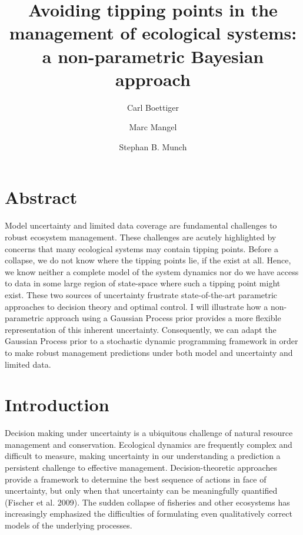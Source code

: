 \documentclass[author-year, review]{elsarticle} %
\begin{document}
\begin{frontmatter}
  \title{Avoiding tipping points in the management of ecological systems: a
non-parametric Bayesian approach}
  \author[cstar]{Carl Boettiger}
  \author[cstar]{Marc Mangel}
  \author[noaa]{Stephan B. Munch}
  \address[cstar]{Center for Stock Assessment Research, Department of Applied Math and Statistics, University of California, Mail Stop SOE-2, Santa Cruz, CA 95064, USA}
  \address[noaa]{Southwest Fisheries Science Center, National Oceanic and Atmospheric Administration, 110 Shaffer Road, Santa Cruz, CA 95060, USA}
 \end{frontmatter}


\section{Abstract}\label{abstract}

Model uncertainty and limited data coverage are fundamental challenges
to robust ecosystem management. These challenges are acutely highlighted
by concerns that many ecological systems may contain tipping points.
Before a collapse, we do not know where the tipping points lie, if the
exist at all. Hence, we know neither a complete model of the system
dynamics nor do we have access to data in some large region of
state-space where such a tipping point might exist. These two sources of
uncertainty frustrate state-of-the-art parametric approaches to decision
theory and optimal control. I will illustrate how a non-parametric
approach using a Gaussian Process prior provides a more flexible
representation of this inherent uncertainty. Consequently, we can adapt
the Gaussian Process prior to a stochastic dynamic programming framework
in order to make robust management predictions under both model and
uncertainty and limited data.

\section{Introduction}\label{introduction}

Decision making under uncertainty is a ubiquitous challenge of natural
resource management and conservation. Ecological dynamics are frequently
complex and difficult to measure, making uncertainty in our
understanding a prediction a persistent challenge to effective
management. Decision-theoretic approaches provide a framework to
determine the best sequence of actions in face of uncertainty, but only
when that uncertainty can be meaningfully quantified (Fischer et al.
2009). The sudden collapse of fisheries and other ecosystems has
increasingly emphasized the difficulties of formulating even
qualitatively correct models of the underlying processes.
\end{document}
